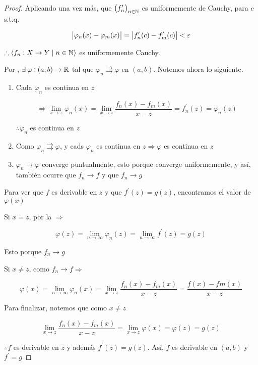 \begin{proof}
     Aplicando una vez más, que ${\left({f}^{\prime}_{n}\right)}_{n \in \mathbb{N}}$ es uniformemente de Cauchy, para $c$ s.t.q.

     $$\abs{{\varphi}_{n}(x) - {\varphi}_{m}(x)} =  \abs{{f}^{\prime}_{n}(c)-{f}^{\prime}_{m}(c)} < \varepsilon$$

     $\therefore \langle f_n : X \to Y \mid n \in \mathbb{N} \rangle$ es uniformemente Cauchy.

     Por , $\exists \: \varphi : (a,b) \to \mathbb{R}$ tal que $\varphi_n \rightrightarrows \varphi$ en $(a,b)$. Notemos ahora lo siguiente.

     \begin{enumerate}
         \item Cada $\varphi_n$ es continua en $z$
         
         $$\Rightarrow \lim_{x \to z} {\varphi}_{n}(x) = \lim_{x \to z} \frac{f_n(x)-f_m(x)}{x-z} = {f}^{\prime}_{n}(z) =  {\varphi}_{n}(z)$$

         $\therefore \varphi_n$ es continua en $z$
         \item Como $\varphi_n \rightrightarrows \varphi$, y cads $\varphi_n$ es continua en $z \Rightarrow \varphi$ es continua en $z$

         \item $\varphi_n \to \varphi$ converge puntualmente, esto porque converge uniformemente, y así, también ocurre que $f_n \to f$ y que $f_n \to g$
     \end{enumerate}

     Para ver que $f$ es derivable en $z$ y que ${f}^{\prime}(z) = g(z)$, encontramos el valor de $\varphi(x)$

     Si $x = z$, por la  $\Rightarrow$

     $$\varphi(z) = \lim_{n \to \infty} {\varphi}_{n}(z) = \lim_{n \to \infty}{f}^{\prime}(z) = g(z) $$

     Esto porque $f_n \to g$

     Si $x \neq z$, como $f_n \to f \Rightarrow$


     $$\varphi(x) = \lim_{n \to \infty} {\varphi}_{n}(x) = \lim_{x \to z} \frac{f_n(x)-f_m(x)}{x-z} = \frac{f(x)-fm(x)}{x-z}$$

     Para finalizar, notemos que como $x \neq z$

     $$\lim_{x \to z} \frac{f_n(x)-f_m(x)}{x-z} = \lim_{x \to z} \varphi(x) = \varphi(z) = g(z)$$

     $\therefore f$ es derivable en $z$ y además ${f}^{\prime}(z) = g(z)$. Así, $f$ es derivable en $(a,b)$ y ${f}^{\prime} = g$
     
\end{proof} 

